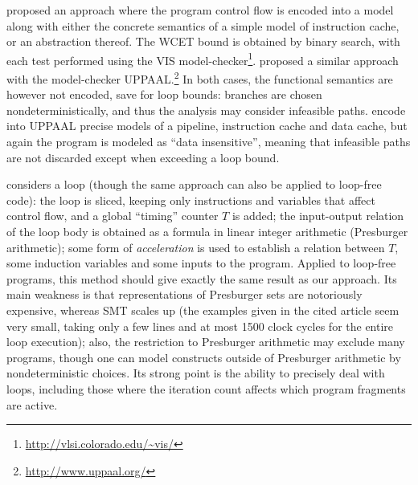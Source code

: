 \documentclass[a4paper,twocolumn,11pt]{article}
\begin{document}
\textcite{metzner-CAV04} proposed an approach where the program control flow is encoded into a model along with either the concrete semantics of a simple model of instruction cache, or an abstraction thereof.
The WCET bound is obtained by binary search, with each test performed using the VIS model-checker\footnote{\url{http://vlsi.colorado.edu/~vis/}}.
\textcite{DBLP:conf/wcet/HuberS09} proposed a similar approach with the model-checker UPPAAL.\footnote{\url{http://www.uppaal.org/}}
In both cases, the functional semantics are however not encoded, save for loop bounds: branches are chosen nondeterministically, and thus the analysis may consider infeasible paths.
\textcite{dalsgaard-et-WCET10} encode into UPPAAL precise models of a pipeline, instruction cache and data cache, but again the program is modeled as ``data insensitive'', meaning that infeasible paths are not discarded except when exceeding a loop bound.



\textcite{Holsti_WCET2008} considers a loop (though the same approach can also be applied to loop-free code): the loop is sliced, keeping only instructions and variables that affect control flow, and a global ``timing'' counter $T$ is added; the input-output relation of the loop body is obtained as a formula in linear integer arithmetic (Presburger arithmetic); some form of \emph{acceleration} is used to establish a relation between $T$, some induction variables and some inputs to the program.
Applied to loop-free programs, this method should give exactly the same result as our approach. Its main weakness is that representations of Presburger sets are notoriously expensive, whereas SMT scales up (the examples given in the cited article seem very small, taking only a few lines and at most 1500 clock cycles for the entire loop execution); also, the restriction to Presburger arithmetic may exclude many programs, though one can model constructs outside of Presburger arithmetic by nondeterministic choices.
Its strong point is the ability to precisely deal with loops, including those where the iteration count affects which program fragments are active.
\end{document}
